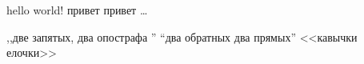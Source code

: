 \documentclass[12pt]{article}
\begin{document}
\pagestyle{empty}

	hello world! привет привет \ldots
	
,,две запятых, два опострафа ''
``два обратных два прямых''
<<кавычки елочки>>
\end{document}
